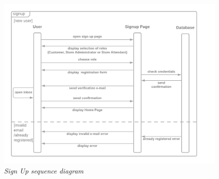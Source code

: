 \documentclass[table, 12pt]{article}
\begin{document}
\begin{figure}[!h]
    \centering
    \includegraphics[scale=0.35]{assets/sign-up.png}
    \caption{\textit{Sign Up sequence diagram}}
\end{figure}
\newpage
\end{document}

